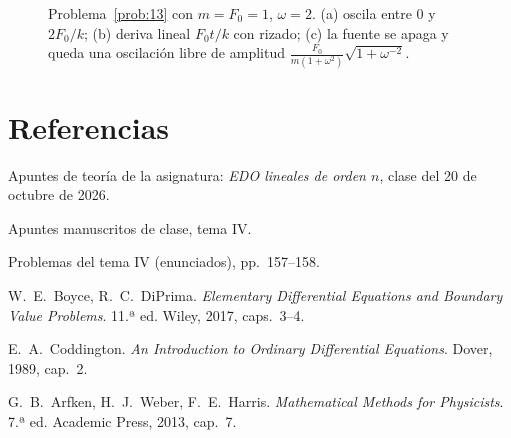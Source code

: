 \documentclass[11pt,twoside]{article}
\begin{document}
\begin{figure}[!htbp]
\centering
{}
\caption{Problema~\ref{prob:13} con $m=F_0=1$, $\omega=2$. (a) oscila entre $0$ y $2F_0/k$; (b) deriva lineal $F_0t/k$ con
rizado; (c) la fuente se apaga y queda una oscilación libre de amplitud $\frac{F_0}{m(1+\omega^2)}\sqrt{1+\omega^{-2}}$.}
\label{fig:prob13}
\end{figure}

\section*{Referencias}
{\small
\begin{enumerate}[label={[\arabic*]},leftmargin=2em,itemsep=1pt]
\item Apuntes de teoría de la asignatura: \emph{EDO lineales de orden $n$}, clase del 20 de octubre de 2026.
\item Apuntes manuscritos de clase, tema IV.
\item Problemas del tema IV (enunciados), pp.~157--158.
\item W.~E.~Boyce, R.~C.~DiPrima. \emph{Elementary Differential Equations and Boundary Value Problems}. 11.ª ed.
Wiley, 2017, caps.~3--4.
\item E.~A.~Coddington. \emph{An Introduction to Ordinary Differential Equations}. Dover, 1989, cap.~2.
\item G.~B.~Arfken, H.~J.~Weber, F.~E.~Harris. \emph{Mathematical Methods for Physicists}. 7.ª ed. Academic Press,
2013, cap.~7.
\end{enumerate}}
\end{document}
